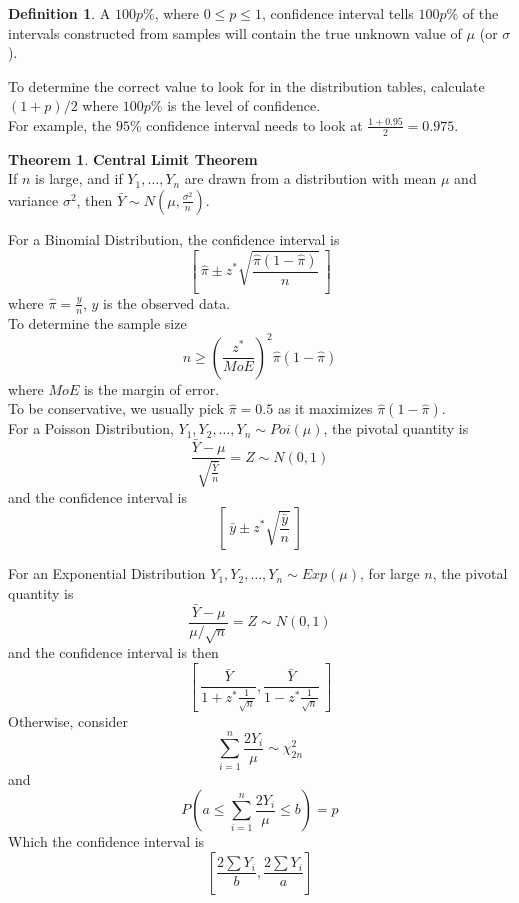 \documentclass[12pt, leqno]{article}
\theoremstyle{definition}
\newtheorem*{defn}{Definition}
\newtheorem*{theorem}{Theorem}
\begin{document}
  \begin{defn}
    A $100p\%$, where $0 \leq p \leq 1$, confidence interval tells $100p\%$ of the intervals constructed from samples will contain the true unknown value of $\mu$ (or $\sigma$).
  \end{defn}

  To determine the correct value to look for in the distribution tables, calculate $(1+p)/2$ where $100p\%$ is the level of confidence. \\
  For example, the $95\%$ confidence interval needs to look at $\frac{1+0.95}{2} = 0.975$.

  \begin{theorem}
  \textbf{Central Limit Theorem} \\
    If $n$ is large, and if $Y_{1}, \dots, Y_{n}$ are drawn from a distribution with mean $\mu$ and variance $\sigma^{2}$, then $\bar{Y} \sim N\left(\mu, \frac{\sigma^{2}}{n}\right)$.
  \end{theorem}

  For a Binomial Distribution, the confidence interval is
  $$\left[~\hat{\pi} \pm z^{*}\sqrt{\frac{\hat{\pi}(1 - \hat{\pi})}{n}}~\right]$$
  where $\hat{\pi} = \frac{y}{n}$, $y$ is the observed data. \\
  To determine the sample size
  $$n \geq \left(\frac{z^{*}}{MoE}\right)^{2}\hat{\pi}(1 - \hat{\pi})$$
  where $MoE$ is the margin of error. \\
  To be conservative, we usually pick $\hat{\pi} = 0.5$ as it maximizes $\hat{\pi}(1 - \hat{\pi})$. \\

  For a Poisson Distribution, $Y_1, Y_2, \dots, Y_n \sim Poi(\mu)$, the pivotal quantity is
  $$\frac{\bar{Y} - \mu}{\sqrt{\frac{\bar{Y}}{n}}} = Z \sim N(0,1)$$
  and the confidence interval is
  $$\left[~\bar{y} \pm z^{*}\sqrt{\frac{\bar{y}}{n}}~\right]$$

  For an Exponential Distribution $Y_1, Y_2, \dots, Y_n \sim Exp(\mu)$, for large $n$, the pivotal quantity is
  $$\frac{\bar{Y} - \mu}{\mu / \sqrt{n}} = Z \sim N(0, 1)$$
  and the confidence interval is then
  $$\left[~ \frac{\bar{Y}}{1 + z^{*}\frac{1}{\sqrt{n}}}, \frac{\bar{Y}}{1 - z^{*}\frac{1}{\sqrt{n}}} ~\right]$$
  Otherwise, consider
  $$\sum_{i=1}^{n}\frac{2Y_{i}}{\mu} \sim \chi_{2n}^{2}$$
  and
  $$P\left(a \leq \sum_{i=1}^{n}\frac{2Y_{i}}{\mu} \leq b\right) = p$$
  Which the confidence interval is
  $$\left[\frac{2\sum Y_{i}}{b}, \frac{2\sum Y_{i}}{a}\right]$$
\end{document}
